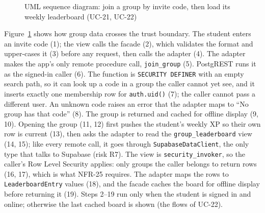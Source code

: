 \documentclass[12pt,letterpaper]{article}
\begin{document}
\begin{figure}[!htbp]
{}
\caption{UML sequence diagram: join a group by invite code, then load its weekly leaderboard (UC-21, UC-22)}
\label{fig:sequence2}
\end{figure}

Figure~\ref{fig:sequence2} shows how group data crosses the trust boundary. The
student enters an invite code (1); the view calls the facade (2), which validates the
format and upper-cases it (3) before any request, then calls the adapter (4). The
adapter makes the app's only remote procedure call, \texttt{join\_group} (5). PostgREST
runs it as the signed-in caller (6). The function is \texttt{SECURITY DEFINER} with an
empty search path, so it can look up a code in a group the caller cannot yet see,
and it inserts exactly one membership row for \texttt{auth.uid()} (7); the caller
cannot pass a different user. An unknown code raises an error that the adapter maps
to ``No group has that code'' (8). The group is returned and cached for offline display
(9, 10). Opening the group (11, 12) first pushes the student's weekly XP so their own
row is current (13), then asks the adapter to read the \texttt{group\_leaderboard} view
(14, 15); like every remote call, it goes through \texttt{SupabaseDataClient}, the only
type that talks to Supabase (risk R7). The view is \texttt{security\_invoker}, so the
caller's Row Level Security applies: only groups the caller belongs to return rows
(16, 17), which is what NFR-25 requires. The adapter maps the rows to
\texttt{LeaderboardEntry} values (18), and the facade caches the board for offline
display before returning it (19). Steps 2--19 run
only when the student is signed in and online; otherwise the last cached board is shown
(the flows of UC-22).
\end{document}
